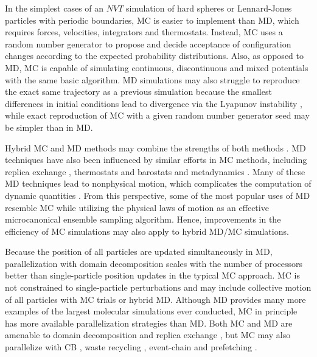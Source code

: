 \documentclass[
  9pt,
  bestpractices,
]{livecoms}
\begin{document}
In the simplest cases of an $NVT$ simulation of hard spheres or Lennard-Jones particles with periodic boundaries, MC is easier to implement than MD, which requires forces, velocities, integrators and thermostats.
Instead, MC uses a random number generator to propose and decide acceptance of configuration changes according to the expected probability distributions.
Also, as opposed to MD, MC is capable of simulating continuous, discontinuous and mixed potentials with the same basic algorithm.
MD simulations may also struggle to reproduce the exact same trajectory as a previous simulation because the smallest differences in initial conditions lead to divergence via the Lyapunov instability \cite{posch_lyapunov_1988}, while exact reproduction of MC with a given random number generator seed may be simpler than in MD.

Hybrid MC and MD methods may combine the strengths of both methods \cite{duane_hybrid_1987, hartmann_ergodic_2008, ghoufi_hybrid_2010, spiridon_hamiltonian_2017, guo_hybrid_2018, fass_quantifying_2018, barhaghi_py-mcmd_2022}.
MD techniques have also been influenced by similar efforts in MC methods, including replica exchange \cite{swendsen_replica_1986, berg_multicanonical_1991, hukushima_exchange_1996, sugita_replica-exchange_1999}, thermostats and barostats \cite{andersen_molecular_1980} and metadynamics \cite{laio_escaping_2002}.
Many of these MD techniques lead to nonphysical motion, which complicates the computation of dynamic quantities \cite{basconi_effects_2013}.
From this perspective, some of the most popular uses of MD resemble MC while utilizing the physical laws of motion as an effective microcanonical ensemble sampling algorithm.
Hence, improvements in the efficiency of MC simulations may also apply to hybrid MD/MC simulations.

Because the position of all particles are updated simultaneously in MD, parallelization with domain decomposition \cite{plimpton_fast_1995} scales with the number of processors better than single-particle position updates in the typical MC approach.
MC is not constrained to single-particle perturbations and may include collective motion of all particles with MC trials \cite{rao_force_1979, liu_rejection-free_2004, liu_generalized_2005, whitelam_avoiding_2007} or hybrid MD.
Although MD provides many more examples of the largest molecular simulations ever conducted, MC in principle has more available parallelization strategies than MD.
Both MC and MD are amenable to domain decomposition \cite{ren_acceleration_2006, anderson_scalable_2016} and replica exchange \cite{swendsen_replica_1986}, but MC may also parallelize with CB \cite{esselink_parallel_1995, vlugt_efficiency_1999}, waste recycling \cite{frenkel_speed-up_2004}, event-chain \cite{michel_generalized_2014} and prefetching \cite{brockwell_parallel_2006, calderhead_general_2014, hatch_parallel_2020}.
\end{document}
